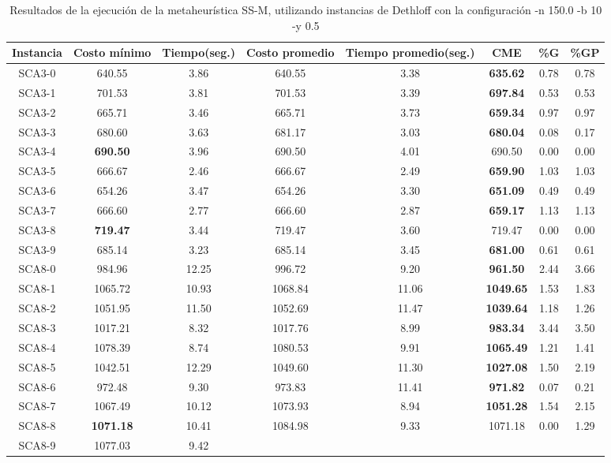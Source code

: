 \begin{table}[h]
\caption{Resultados de la ejecución de la metaheurística SS-M, utilizando instancias de Dethloff con la configuración -n 150.0 -b 10 -y 0.5}
\centering
\small
\begin{tabular}{c c c c c c c c}
\hline\hline
Instancia & Costo mínimo & Tiempo(seg.) & Costo promedio & Tiempo promedio(seg.) & CME & \%G & \%GP \\ [0.5ex]
\hline
SCA3-0 & 640.55 & 3.86 & 
640.55 & 3.38 & \bf{635.62} & 
0.78 & 0.78\\SCA3-1 & 701.53 & 3.81 & 
701.53 & 3.39 & \bf{697.84} & 
0.53 & 0.53\\SCA3-2 & 665.71 & 3.46 & 
665.71 & 3.73 & \bf{659.34} & 
0.97 & 0.97\\SCA3-3 & 680.60 & 3.63 & 
681.17 & 3.03 & \bf{680.04} & 
0.08 & 0.17\\SCA3-4 & \bf{690.50} & 3.96 & 
690.50 & 4.01 & 690.50 & 0.00
 & 0.00\\
SCA3-5 & 666.67 & 2.46 & 
666.67 & 2.49 & \bf{659.90} & 
1.03 & 1.03\\SCA3-6 & 654.26 & 3.47 & 
654.26 & 3.30 & \bf{651.09} & 
0.49 & 0.49\\SCA3-7 & 666.60 & 2.77 & 
666.60 & 2.87 & \bf{659.17} & 
1.13 & 1.13\\SCA3-8 & \bf{719.47} & 3.44 & 
719.47 & 3.60 & 719.47 & 0.00
 & 0.00\\
SCA3-9 & 685.14 & 3.23 & 
685.14 & 3.45 & \bf{681.00} & 
0.61 & 0.61\\SCA8-0 & 984.96 & 12.25 & 
996.72 & 9.20 & \bf{961.50} & 
2.44 & 3.66\\SCA8-1 & 1065.72 & 10.93 & 
1068.84 & 11.06 & \bf{1049.65} & 
1.53 & 1.83\\SCA8-2 & 1051.95 & 11.50 & 
1052.69 & 11.47 & \bf{1039.64} & 
1.18 & 1.26\\SCA8-3 & 1017.21 & 8.32 & 
1017.76 & 8.99 & \bf{983.34} & 
3.44 & 3.50\\SCA8-4 & 1078.39 & 8.74 & 
1080.53 & 9.91 & \bf{1065.49} & 
1.21 & 1.41\\SCA8-5 & 1042.51 & 12.29 & 
1049.60 & 11.30 & \bf{1027.08} & 
1.50 & 2.19\\SCA8-6 & 972.48 & 9.30 & 
973.83 & 11.41 & \bf{971.82} & 
0.07 & 0.21\\SCA8-7 & 1067.49 & 10.12 & 
1073.93 & 8.94 & \bf{1051.28} & 
1.54 & 2.15\\SCA8-8 & \bf{1071.18} & 10.41 & 
1084.98 & 9.33 & 1071.18 & 0.00
 & 1.29\\SCA8-9 & 1077.03 & 9.42 & 

\end{tabular}
\end{table}
